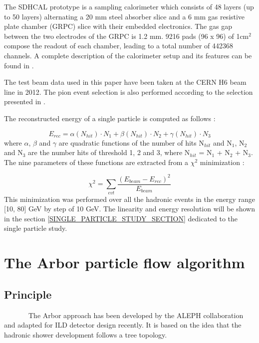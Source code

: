\documentclass[cits]{JINST}
\begin{document}
The SDHCAL prototype is a sampling calorimeter which consists of 48 layers (up to 50 layers) alternating a 20 mm steel absorber slice and a 6 mm gas resistive plate chamber (GRPC) slice with their embedded electronics. The gas gap between the two electrodes of the GRPC is 1.2 mm. 9216 pads (96 x 96) of 1cm$^2$ compose the readout of each chamber, leading to a total number of 442368 channels. A complete description of the calorimeter setup and its features can be found in \cite{sdhcal-paper}. 

The test beam data used in this paper have been taken at the CERN H6 beam line in 2012. The pion event selection is also performed according to the selection presented in \cite{sdhcal-paper}.

The reconstructed energy of a single particle is computed as follows :

\begin{equation}
  E_{rec} = \alpha(N_{hit}) \cdot N_{1}
          + \beta(N_{hit}) \cdot N_{2}
          + \gamma(N_{hit}) \cdot N_{3}   
\end{equation}
where $\alpha$, $\beta$ and $\gamma$ are quadratic functions of the number of hits N$_{hit}$ and N$_1$, N$_2$ and N$_3$ are the number hits of threshold 1, 2 and 3, where N$_{hit}$ = N$_1$ + N$_2$ + N$_3$. The nine parameters of these functions are extracted from a $\chi^2$ minimization :

\begin{equation}
  \chi^2 = \sum\limits_{evt} \frac{(E_{beam} - E_{rec})^2}{E_{beam}}
\end{equation}
This minimization was performed over all the hadronic events in the energy range [10, 80] GeV by step of 10 GeV. The linearity and energy resolution will be shown in the section \ref{SINGLE_PARTICLE_STUDY_SECTION} dedicated to the single particle study.

\newpage
\section{The Arbor particle flow algorithm}

\subsection{Principle} 

~~~~~~~The Arbor approach has been developed by the ALEPH collaboration and adapted \cite{arbor-manqi} for ILD detector design recently. It is based on the idea that the hadronic shower development follows a tree topology.
\end{document}
